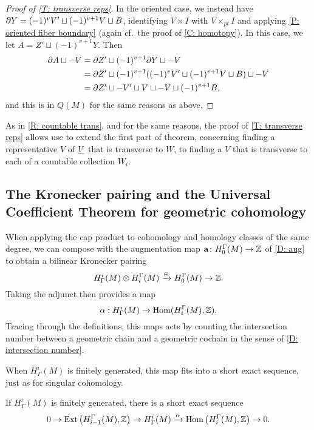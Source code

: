 \begin{proof}[Proof of \cref{T: transverse reps}]
	In the oriented case, we instead have $\partial Y = (-1)^{v} V' \sqcup (-1)^{v+1} V \sqcup B$, identifying $V \times I$ with $V \times_{pt} I$ and applying \cref{P: oriented fiber boundary} (again cf.\ the proof of \cref{C: homotopy}).
	In this case, we let $A = Z' \sqcup (-1)^{v+1} Y$.
	Then
	\begin{align*}
		\partial A \sqcup -V &= \partial Z' \sqcup (-1)^{v+1}\partial Y \sqcup -V\\
		&= \partial Z' \sqcup (-1)^{v+1}((-1)^{v} V' \sqcup (-1)^{v+1} V \sqcup B) \sqcup -V\\
		&= \partial Z' \sqcup -V' \sqcup V \sqcup -V \sqcup (-1)^{v+1}B,
	\end{align*}
	and this is in $Q(M)$ for the same reasons as above.
\end{proof}


\begin{remark}\label{R: countable trans2}
As in \cref{R: countable trans}, and for the same reasons, the proof of \cref{T: transverse reps} allows use to extend the first part of theorem, concerning finding a representative $V$ of $\underline{V}$ that is transverse to $W$, to finding a $V$ that is transverse to each of a countable collection $W_i$.
\end{remark}




\subsection{The Kronecker pairing and the Universal Coefficient Theorem for geometric cohomology}\label{S: kroneker}

When applying the cap product to cohomology and homology classes of the same degree, we can compose with the augmentation map $\mathbf{a} \colon H_0^\Gamma(M) \to \mathbb{Z}$ of \cref{D: aug} to obtain a bilinear Kronecker pairing
$$H^i_\Gamma(M) \otimes H_i^\Gamma(M) \xrightarrow{\nplus} H_0^\Gamma(M) \to \mathbb{Z}.$$
Taking the adjunct then provides a map
$$\alpha: H^i_\Gamma(M) \to \textup{Hom}(H_i^\Gamma(M),\mathbb{Z}).$$
Tracing through the definitions, this maps acts by counting the intersection number between a geometric chain and a geometric cochain in the sense of \cref{D: intersection number}.

When $H^i_\Gamma(M)$ is finitely generated, this map fits into a short exact sequence, just as for singular cohomology.

\begin{theorem}\label{T: UCT}
	If $H^i_\Gamma(M)$ is finitely generated, there is a short exact sequence
	\[
	0 \to \text{Ext}\left(H_{i-1}^\Gamma(M),\mathbb{Z}\right) \to H^i_\Gamma(M) \xrightarrow{\alpha} \textup{Hom}\left(H_i^\Gamma(M),\mathbb{Z}\right) \to 0.
	\]
\end{theorem}


